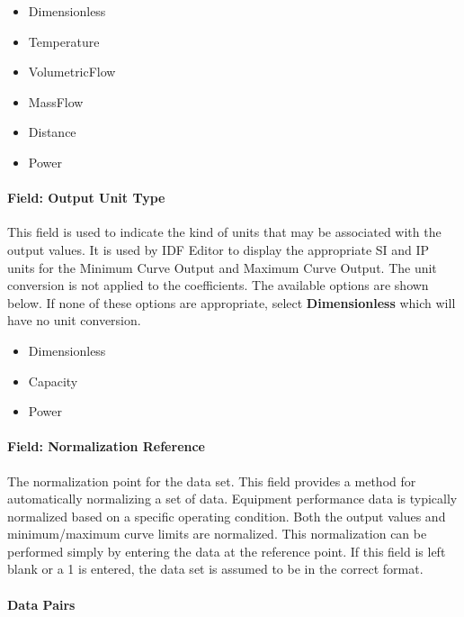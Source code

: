 \begin{itemize}
\item
  Dimensionless
\item
  Temperature
\item
  VolumetricFlow
\item
  MassFlow
\item
  Distance
\item
  Power
\end{itemize}

\paragraph{Field: Output Unit Type}\label{field-output-unit-type-000}

This field is used to indicate the kind of units that may be associated with the output values. It is used by IDF Editor to display the appropriate SI and IP units for the Minimum Curve Output and Maximum Curve Output. The unit conversion is not applied to the coefficients. The available options are shown below. If none of these options are appropriate, select \textbf{Dimensionless} which will have no unit conversion.

\begin{itemize}
\item
  Dimensionless
\item
  Capacity
\item
  Power
\end{itemize}

\paragraph{Field: Normalization Reference}\label{field-normalization-reference}

The normalization point for the data set. This field provides a method for automatically normalizing a set of data. Equipment performance data is typically normalized based on a specific operating condition. Both the output values and minimum/maximum curve limits are normalized. This normalization can be performed simply by entering the data at the reference point. If this field is left blank or a 1 is entered, the data set is assumed to be in the correct format.

\paragraph{Data Pairs}\label{data-pairs}

